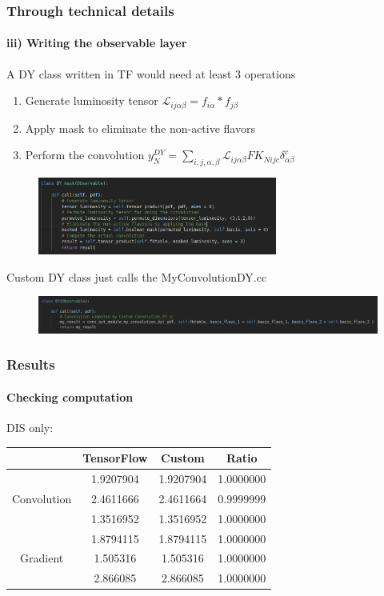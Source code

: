 \documentclass[aspectratio=43]{beamer}
\begin{document}
\begin{frame}

	\frametitle{Through technical details}
	\framesubtitle{iii) Writing the observable layer}
	A DY class written in TF would need at least 3 operations
	\begin{enumerate}
		\item Generate luminosity tensor $\mathcal{L}_{i j \alpha \beta} = f_{i \alpha} \ast f_{j \beta}$
		\item Apply mask to eliminate the non-active flavors
		\item Perform the convolution $y_{N}^{DY} = \sum_{i, j, \alpha, \beta} \mathcal{L}_{i j \alpha \beta} FK_{N i j c} \delta^{c}_{\alpha \beta}$
	\end{enumerate}
		\begin{figure}
			\includegraphics[width = 0.7\textwidth]{dyclassold.png}
		\end{figure}
	Custom DY class just calls the {\color{blue}MyConvolutionDY.cc}
	\begin{figure}
		\includegraphics[width = 1.05\textwidth]{dyclass.png}
	\end{figure}

\end{frame}

\begin{frame}

	\frametitle{Results}
	\framesubtitle{Checking computation}
	
	{\Large DIS only:}
	\begin{table}
		\centering
		\begin{tabular}{c c c c}
			& TensorFlow & Custom & Ratio \\ \hline
			& 1.9207904 & 1.9207904 & {\color{darkgreen} 1.0000000} \\
			Convolution & 2.4611666 & 2.4611664 & {\color{darkgreen} 0.9999999} \\
			& 1.3516952 & 1.3516952 & {\color{darkgreen} 1.0000000} \\
			\hline
			& 1.8794115 & 1.8794115 & {\color{darkgreen} 1.0000000} \\
			Gradient & 1.505316 & 1.505316 & {\color{darkgreen} 1.0000000} \\
			& 2.866085 & 2.866085 & {\color{darkgreen} 1.0000000} \\
			\hline
		\end{tabular}
	\end{table}

\end{frame}
\end{document}
